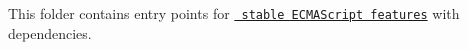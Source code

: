 This folder contains entry points for \href{https://github.com/zloirock/core-js/tree/v3\#ecmascript}{\texttt{ stable ECMAScript features}} with dependencies. 